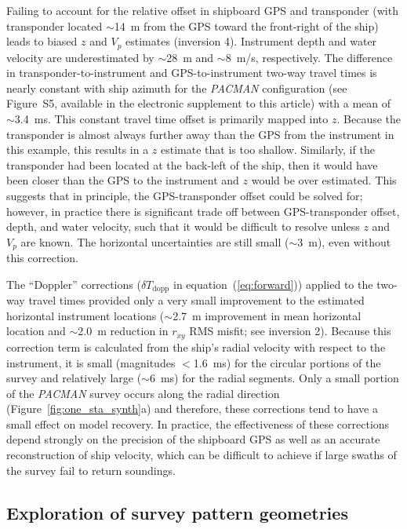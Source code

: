 \documentclass[10pt,titlepage]{article}
\begin{document}
Failing to account for the relative offset in shipboard GPS and transponder (with transponder located $\sim$14~m from the GPS toward the front-right of the ship) leads to biased $z$ and $V_p$ estimates (inversion 4). Instrument depth and water velocity are underestimated by $\sim$28~m and $\sim$8~m/s, respectively. The difference in transponder-to-instrument and GPS-to-instrument two-way travel times is nearly constant with ship azimuth for the \textit{PACMAN} configuration (see Figure~S5, available in the electronic supplement to this article) with a mean of $\sim$3.4~ms. This constant travel time offset is primarily mapped into $z$. Because the transponder is almost always further away than the GPS from the instrument in this example, this results in a $z$ estimate that is too shallow. Similarly, if the transponder had been located at the back-left of the ship, then it would have been closer than the GPS to the instrument and $z$ would be over estimated. This suggests that in principle, the GPS-transponder offset could be solved for; however, in practice there is significant trade off between GPS-transponder offset, depth, and water velocity, such that it would be difficult to resolve unless $z$ and $V_p$ are known. The horizontal uncertainties are still small ($\sim$3~m), even without this correction.

The ``Doppler'' corrections ($\delta T_{\text{dopp}}$ in equation~(\ref{eq:forward})) applied to the two-way travel times provided only a very small improvement to the estimated horizontal instrument locations ($\sim$2.7~m improvement in mean horizontal location and $\sim$2.0~m reduction in $r_{xy}$ RMS misfit; see inversion 2). Because this correction term is calculated from the ship's radial velocity with respect to the instrument, it is small (magnitudes $<$1.6~ms) for the circular portions of the survey and relatively large ($\sim$6~ms) for the radial segments. Only a small portion of the \textit{PACMAN} survey occurs along the radial direction (Figure~\ref{fig:one_sta_synth}a) and therefore, these corrections tend to have a small effect on model recovery. In practice, the effectiveness of these corrections depend strongly on the precision of the shipboard GPS as well as an accurate reconstruction of ship velocity, which can be difficult to achieve if large swaths of the survey fail to return soundings.


\subsection{Exploration of survey pattern geometries} \label{sec:surv_geom_tests}
\end{document}
